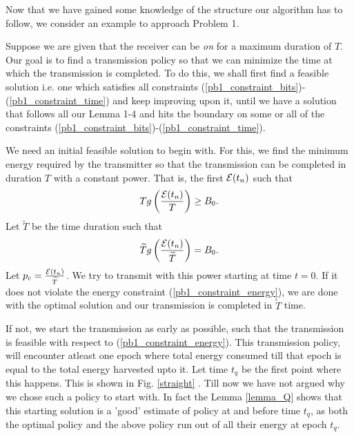 Now that we have gained some knowledge of the structure our algorithm has to follow, we consider an example to approach Problem 1. 

Suppose we are given that the receiver can be \textit{on} for a maximum duration of $T$. Our goal is to find a transmission policy so that we can minimize the time at which the transmission is completed. To do this, we shall first find a feasible solution i.e. one which satisfies all constraints (\ref{pb1_constraint_bits})-(\ref{pb1_constraint_time}) and keep improving upon it, until we have a solution that follows all our Lemma 1-4 and hits the boundary on some or all of the constraints (\ref{pb1_constraint_bits})-(\ref{pb1_constraint_time}). 

We need an initial feasible solution to begin with. For this, we find the minimum energy required by the transmitter so that the transmission can be completed in duration $T$ with a constant power. That is, the first $\mathcal{E}(t_n)$ such that
\begin{equation}
T g\left(\frac{\mathcal{E}(t_n)}{T}\right)\geq B_0.
\end{equation}
Let $\widetilde{T}$ be the time duration such that
\begin{equation}
\widetilde{T}g\left(\frac{\mathcal{E}(t_n)}{\widetilde{T}}\right)=B_0.
\end{equation}
Let $p_c=\frac{\mathcal{E}(t_n)}{\widetilde{T}}$. We try to transmit with this power starting at time $t=0$. If it does not violate the energy constraint (\ref{pb1_constraint_energy}), we are done with the optimal solution and our transmission is completed in $\widetilde{T}$ time.

If not, we start the transmission as early as possible, such that the transmission is feasible with respect to (\ref{pb1_constraint_energy}). This transmission policy, will encounter atleast one epoch where total energy consumed till that epoch is equal to the total energy harvested upto it. Let time $t_q$ be the first point where this happens. This is shown in Fig. \ref{straight} .  Till now we have not argued why we chose such a policy to start with. In fact the Lemma \ref{lemma_Q} shows that this starting solution is a 'good' estimate of policy at and before time $t_q$, as both the optimal policy and the above policy run out of all their energy at epoch $t_q$. 

